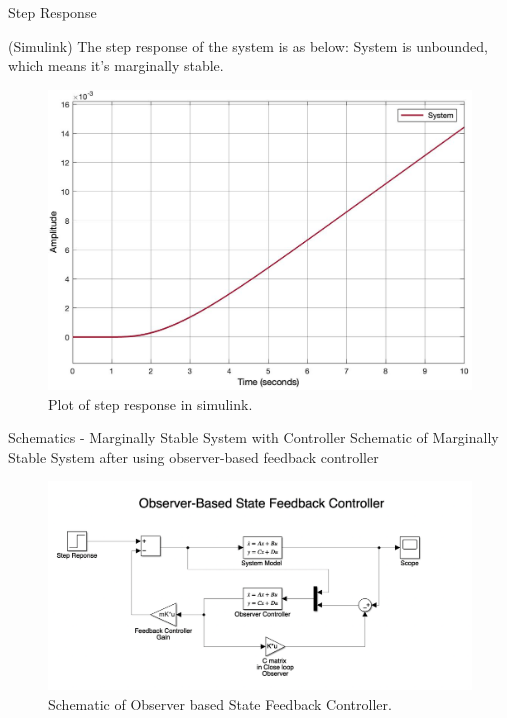 \documentclass[10pt,compress,mathserif]{beamer}
\begin{document}
\begin{frame}{Step Response}

(Simulink) The step response of the system is as below: System is unbounded, which means it's marginally stable. 
\vskip10pt
\begin{figure}[h!]
\centering
\includegraphics[scale=0.15]{UnstableSystem_response.jpg}
\caption{Plot of step response in simulink.}
\end{figure}

\end{frame}


\begin{frame}{Schematics - Marginally Stable System with Controller}
Schematic of Marginally Stable System after using observer-based feedback controller
\vskip10pt
\begin{figure}[h!]
\centering
\includegraphics[scale=0.3]{ObserverbasedSFC.jpeg}
\caption{Schematic of Observer based State Feedback Controller.}
\end{figure}

\end{frame}
\end{document}
